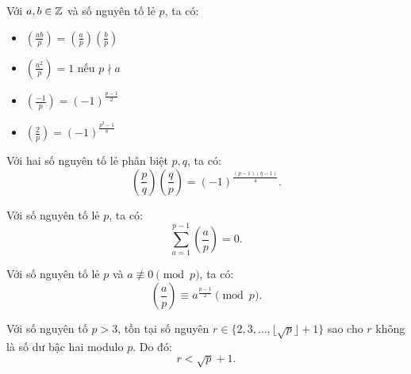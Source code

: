 \documentclass[../imo-training-open-book.tex]{subfiles}
\begin{document}
\vspace{1em}

\begin{theorem*}
    \label{theorem:legendre-basic-properties}
    Với \( a, b \in \mathbb Z \) và số nguyên tố lẻ \( p \), ta có:
    \begin{itemize}[topsep=0pt, itemsep=0pt]
        \item \( \left( \frac{ab}{p} \right) = \left( \frac{a}{p} \right)\left( \frac{b}{p} \right) \)
        \item \( \left( \frac{a^2}{p} \right) = 1 \) nếu \( p \nmid a \)
        \item \( \left( \frac{-1}{p} \right) = (-1)^{\frac{p-1}{2}} \)
        \item \( \left( \frac{2}{p} \right) = (-1)^{\frac{p^2 - 1}{8}} \)
    \end{itemize}
\end{theorem*}

\vspace{1em}

\begin{theorem*}
    \label{theorem:quadratic-reciprocity}
    Với hai số nguyên tố lẻ phân biệt \( p, q \), ta có:
    \[
        \left( \frac{p}{q} \right) \left( \frac{q}{p} \right) = (-1)^{\frac{(p-1)(q-1)}{4}}.
    \]
\end{theorem*}

\vspace{1em}

\begin{corollary*}
    \label{corollary:legendre-sum-zero}
    Với số nguyên tố lẻ \( p \), ta có:
    \[
        \sum_{a = 1}^{p - 1} \left( \frac{a}{p} \right) = 0.
    \]
\end{corollary*}

\vspace{1em}

\begin{theorem*}
    \label{theorem:euler-criterion}
    Với số nguyên tố lẻ \( p \) và \( a \not\equiv 0 \pmod{p} \), ta có:
    \[
        \left( \frac{a}{p} \right) \equiv a^{\frac{p-1}{2}} \pmod{p}.
    \]
\end{theorem*}

\vspace{1em}

\begin{theorem*}
    \label{theorem:least-quadratic-nonresidue}
    Với số nguyên tố \( p > 3 \), tồn tại số nguyên \( r \in \{2, 3, \ldots, \lfloor \sqrt{p} \rfloor + 1\} \) sao cho \( r \) không là số dư bậc hai modulo \( p \). Do đó:
    \[
        r < \sqrt{p} + 1.
    \]
\end{theorem*}
\end{document}
